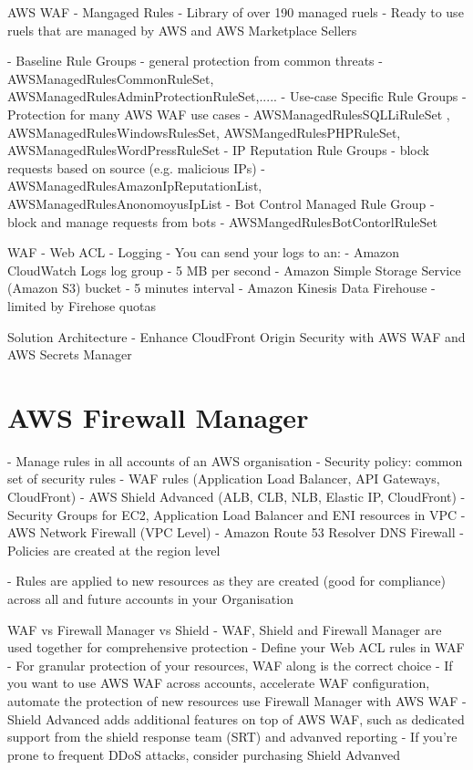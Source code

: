 \documentclass[11pt]{book}
\begin{document}
    AWS WAF - Mangaged Rules
    - Library of over 190 managed ruels
    - Ready to use ruels that are managed by AWS and AWS Marketplace Sellers

    - Baseline Rule Groups - general protection from common threats
        - AWSManagedRulesCommonRuleSet, AWSManagedRulesAdminProtectionRuleSet,.....
    - Use-case Specific Rule Groups - Protection for many AWS WAF use cases
        - AWSManagedRulesSQLLiRuleSet , AWSManagedRulesWindowsRulesSet, AWSMangedRulesPHPRuleSet, AWSManagedRulesWordPressRuleSet
    - IP Reputation Rule Groups - block requests based on source (e.g. malicious IPs)
        - AWSManagedRulesAmazonIpReputationList, AWSManagedRulesAnonomoyusIpList
    - Bot Control Managed Rule Group - block and manage requests from bots
        - AWSMangedRulesBotContorlRuleSet

    WAF - Web ACL - Logging
    - You can send your logs to an:
        - Amazon CloudWatch Logs log group - 5 MB per second
        - Amazon Simple Storage Service (Amazon S3) bucket - 5 minutes interval
        - Amazon Kinesis Data Firehouse - limited by Firehose quotas


    Solution Architecture - Enhance CloudFront Origin
    Security with AWS WAF and AWS Secrets Manager


    \section{AWS Firewall Manager}
    - Manage rules in all accounts of an AWS organisation
    - Security policy: common set of security rules
        - WAF rules (Application Load Balancer, API Gateways, CloudFront)
        - AWS Shield Advanced (ALB, CLB, NLB, Elastic IP, CloudFront)
        - Security Groups for EC2, Application Load Balancer and ENI resources in VPC
        - AWS Network Firewall (VPC Level)
        - Amazon Route 53 Resolver DNS Firewall
        - Policies are created at the region level

    - Rules are applied to new resources as they are created (good for compliance) across all and future accounts in your Organisation

    WAF vs Firewall Manager vs Shield
    - WAF, Shield and Firewall Manager are used together for comprehensive protection
    - Define your Web ACL rules in WAF
    - For granular protection of your resources, WAF along is the correct choice
    - If you want to use AWS WAF across accounts, accelerate WAF configuration, automate the protection of new resources use Firewall Manager with AWS WAF
    - Shield Advanced adds additional features on top of AWS WAF, such as dedicated support from the shield response team (SRT) and advanved reporting
    - If you're prone to frequent DDoS attacks, consider purchasing Shield Advanved
\end{document}
